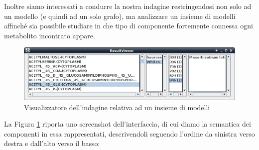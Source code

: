Inoltre siamo interessati a condurre la nostra indagine restringendosi
non solo ad un modello (e quindi ad un solo grafo), ma analizzare un
insieme di modelli affinch\'e sia possibile studiare in che tipo di
componente fortemente connessa ogni metabolito incontrato appare.

\begin{figure}
  \centering
  \includegraphics[scale=.5,
  angle=90]{images/ResultViewer-execution.eps}
  \caption{Visualizzatore dell'indagine relativa ad un insieme di
    modelli}
  \label{fig:result-viewer-scc}
\end{figure}
La Figura \ref{fig:result-viewer-scc} riporta uno screenshot
dell'interfaccia, di cui diamo la semantica dei componenti in essa
rappresentati, descrivendoli seguendo l'ordine da sinistra verso
destra e dall'alto verso il basso:
